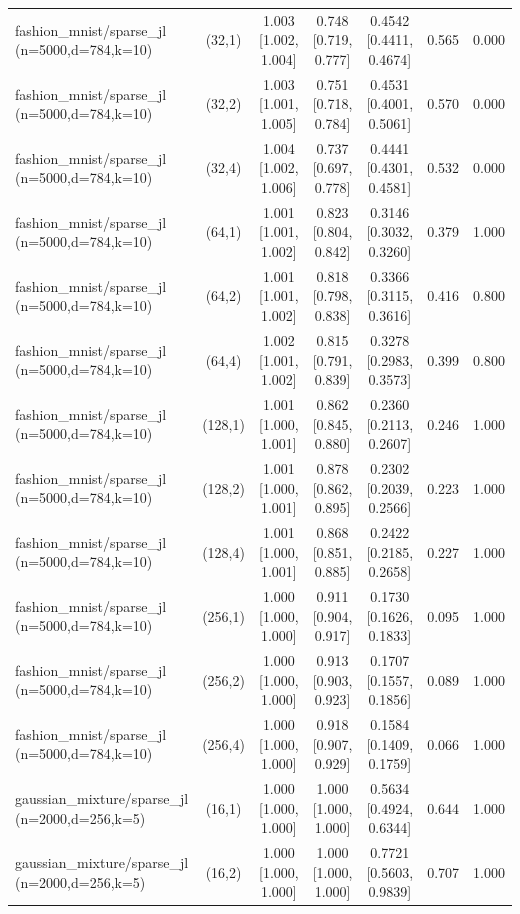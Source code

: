 \begin{tabular}{lcccccc}
fashion\_mnist/sparse\_jl (n=5000,d=784,k=10) & (32,1) & 1.003 [1.002, 1.004] & 0.748 [0.719, 0.777] & 0.4542 [0.4411, 0.4674] & 0.565 & 0.000 \\
fashion\_mnist/sparse\_jl (n=5000,d=784,k=10) & (32,2) & 1.003 [1.001, 1.005] & 0.751 [0.718, 0.784] & 0.4531 [0.4001, 0.5061] & 0.570 & 0.000 \\
fashion\_mnist/sparse\_jl (n=5000,d=784,k=10) & (32,4) & 1.004 [1.002, 1.006] & 0.737 [0.697, 0.778] & 0.4441 [0.4301, 0.4581] & 0.532 & 0.000 \\
fashion\_mnist/sparse\_jl (n=5000,d=784,k=10) & (64,1) & 1.001 [1.001, 1.002] & 0.823 [0.804, 0.842] & 0.3146 [0.3032, 0.3260] & 0.379 & 1.000 \\
fashion\_mnist/sparse\_jl (n=5000,d=784,k=10) & (64,2) & 1.001 [1.001, 1.002] & 0.818 [0.798, 0.838] & 0.3366 [0.3115, 0.3616] & 0.416 & 0.800 \\
fashion\_mnist/sparse\_jl (n=5000,d=784,k=10) & (64,4) & 1.002 [1.001, 1.002] & 0.815 [0.791, 0.839] & 0.3278 [0.2983, 0.3573] & 0.399 & 0.800 \\
fashion\_mnist/sparse\_jl (n=5000,d=784,k=10) & (128,1) & 1.001 [1.000, 1.001] & 0.862 [0.845, 0.880] & 0.2360 [0.2113, 0.2607] & 0.246 & 1.000 \\
fashion\_mnist/sparse\_jl (n=5000,d=784,k=10) & (128,2) & 1.001 [1.000, 1.001] & 0.878 [0.862, 0.895] & 0.2302 [0.2039, 0.2566] & 0.223 & 1.000 \\
fashion\_mnist/sparse\_jl (n=5000,d=784,k=10) & (128,4) & 1.001 [1.000, 1.001] & 0.868 [0.851, 0.885] & 0.2422 [0.2185, 0.2658] & 0.227 & 1.000 \\
fashion\_mnist/sparse\_jl (n=5000,d=784,k=10) & (256,1) & 1.000 [1.000, 1.000] & 0.911 [0.904, 0.917] & 0.1730 [0.1626, 0.1833] & 0.095 & 1.000 \\
fashion\_mnist/sparse\_jl (n=5000,d=784,k=10) & (256,2) & 1.000 [1.000, 1.000] & 0.913 [0.903, 0.923] & 0.1707 [0.1557, 0.1856] & 0.089 & 1.000 \\
fashion\_mnist/sparse\_jl (n=5000,d=784,k=10) & (256,4) & 1.000 [1.000, 1.000] & 0.918 [0.907, 0.929] & 0.1584 [0.1409, 0.1759] & 0.066 & 1.000 \\
gaussian\_mixture/sparse\_jl (n=2000,d=256,k=5) & (16,1) & 1.000 [1.000, 1.000] & 1.000 [1.000, 1.000] & 0.5634 [0.4924, 0.6344] & 0.644 & 1.000 \\
gaussian\_mixture/sparse\_jl (n=2000,d=256,k=5) & (16,2) & 1.000 [1.000, 1.000] & 1.000 [1.000, 1.000] & 0.7721 [0.5603, 0.9839] & 0.707 & 1.000 \\

\end{tabular}
